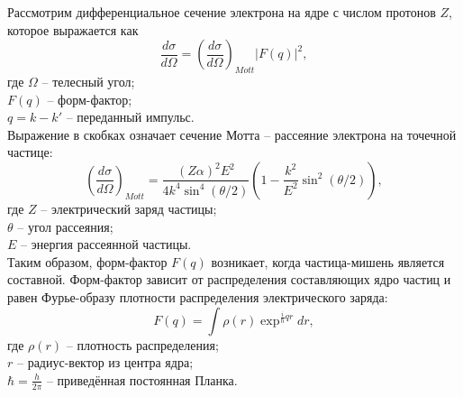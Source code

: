 \documentclass{extarticle}
\begin{document}
Рассмотрим дифференциальное сечение электрона на ядре с числом протонов $Z$, которое выражается как 
\begin{equation}
    \frac{d\sigma}{d\Omega} = ( \frac{d\sigma}{d\Omega})_{Mott} |F(q)|^2 ,
\end{equation}
где $\Omega$ -- телесный угол; \\ $F(q)$ -- форм-фактор; \\ $q = k-k'$ -- переданный импульс.\\ Выражение в скобках означает сечение Мотта -- рассеяние электрона на точечной частице:
\begin{equation}
    (\frac{d\sigma}{d\Omega})_{Mott} = \frac{(Z\alpha)^2 E^2}{4k^4 \sin^4 (\theta/2)} (1- \frac{k^2}{E^2} \sin^2(\theta/2)),
\end{equation}
где $Z$ -- электрический заряд частицы; \\ $\theta$ -- угол рассеяния; \\ $E$ -- энергия рассеянной частицы. \\ Таким образом, форм-фактор $F(q)$ возникает, когда частица-мишень является составной. Форм-фактор зависит от распределения составляющих ядро частиц и равен Фурье-образу плотности распределения электрического заряда:
\begin{equation}
    F(q) = \int \rho(r) \exp^{\frac{i}{\hbar}qr}dr,
\end{equation}
где $\rho(r)$ -- плотность распределения; \\ $r$ -- радиус-вектор из центра ядра; \\ $\hbar = \frac{h}{2\pi}$ -- приведённая постоянная Планка.
\end{document}
